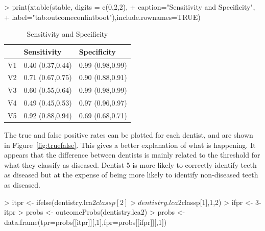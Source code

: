 \begin{Schunk}
\begin{Sinput}
> print(xtable(stable, digits = c(0,2,2),
+ 	caption="Sensitivity and Specificity",
+ 	label="tab:outcomeconfintboot"),include.rownames=TRUE)
\end{Sinput}
\begin{table}[ht]
\centering
\begin{tabular}{rll}
  \hline
 & Sensitivity & Specificity \\ 
  \hline
V1 & 0.40 (0.37,0.44) & 0.99 (0.98,0.99) \\ 
  V2 & 0.71 (0.67,0.75) & 0.90 (0.88,0.91) \\ 
  V3 & 0.60 (0.55,0.64) & 0.99 (0.98,0.99) \\ 
  V4 & 0.49 (0.45,0.53) & 0.97 (0.96,0.97) \\ 
  V5 & 0.92 (0.88,0.94) & 0.69 (0.68,0.71) \\ 
   \hline
\end{tabular}
\caption{Sensitivity and Specificity} 
\label{tab:outcomeconfintboot}
\end{table}\end{Schunk}


The true and false positive rates can be plotted for each dentist, and are shown in Figure~\ref{fig:truefalse}. This gives a better explanation of what is happening. It appears that the difference between dentists is mainly related to the threshold for what they classify as diseased. Dentist 5 is more likely to correctly identify teeth as diseased but at the expense of being more likely to identify non-diseased teeth as diseased.

\begin{Schunk}
\begin{Sinput}
> itpr <- ifelse(dentistry.lca2$classp[2]>dentistry.lca2$classp[1],1,2)
> ifpr <- 3-itpr
> probs <- outcomeProbs(dentistry.lca2)
> probs <- data.frame(tpr=probs[[itpr]][,1],fpr=probs[[ifpr]][,1])
\end{Sinput}
\end{Schunk}

